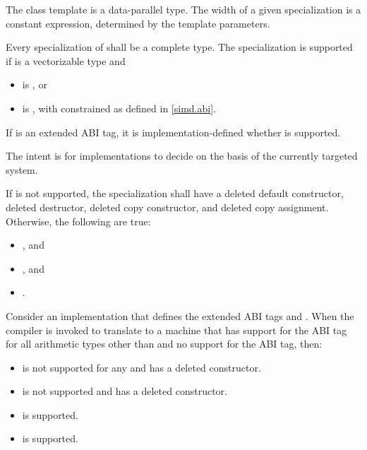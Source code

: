 \begin{wgText}
\pnum
The class template  is a data-parallel type. The width of a given  specialization is a constant expression, determined by the template parameters.

\pnum
Every specialization of  shall be a complete type. The specialization  is supported if  is a vectorizable type and
\begin{itemize}
  \item {} is , or
  \item {} is , with  constrained as defined in \ref{simd.abi}.
\end{itemize}

If  is an extended ABI tag, it is implementation-defined whether  is supported. \begin{note}The intent is for implementations to decide on the basis of the currently targeted system.\end{note}

If  is not supported, the specialization shall have a deleted default constructor, deleted destructor, deleted copy constructor, and deleted copy assignment.
Otherwise, the following are true:
\begin{itemize}
  \item {}, and
  \item {}, and
  \item {}.
\end{itemize}

\begin{example}
  Consider an implementation that defines the extended ABI tags  and . When the compiler is invoked to translate to a machine that has support for the  ABI tag for all arithmetic types other than  and no support for the  ABI tag, then:
  \begin{itemize}
    \item {} is not supported for any  and has a deleted constructor.
    \item {} is not supported and has a deleted constructor.
    \item {} is supported.
    \item {} is supported.
  \end{itemize}
\end{example}


\end{wgText}
